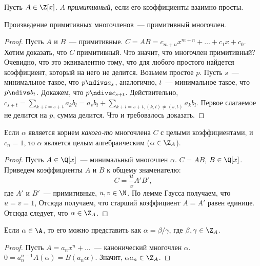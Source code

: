 \begin{df}
  Пусть $A \in \Z[x]$. $A$ \emph{примитивный}, если его коэффициенты
  взаимно просты.
\end{df}

\begin{lemma}[Гаусса]
  Произведение примитивных многочленов~— примитивный многочлен.
\end{lemma}
\begin{proof}
  Пусть $A$ и $B$~— примитивные. $C = AB = c_{m+n}x^{m+n} + \ldots +
  c_1 x + c_0$. Хотим доказать, что $C$ примитивный. Что значит, что
  многочлен примитивный? Очевидно, что это эквивалентно тому, что для
  любого простого найдется коэффициент, который на него не
  делится. Возьмем простое $p$. Пусть $s$~— минимальное такое, что $p
  \ndivs a_s$, аналогично, $t$~— минимальное такое, что $p \ndivs
  b_t$. Докажем, что $p \ndivs c_{s+t}$. Действительно, $c_{s+t} =
  \sum_{k+l = s+t} a_k b_l = a_s b_t + \sum_{k+l=s+t, (k, l) \ne
    (s,t)} a_k b_l$. Первое слагаемое не делится на $p$, сумма
  делится. Что и требовалось доказать.
\end{proof}

\begin{theorem}
  Если $\alpha$ является корнем \emph{какого-то} многочлена $C$ с
  целыми коэффициентами, и $c_n = 1$, то $\alpha$ является целым
  алгебраическим ($\alpha \in \Z_A$).
\end{theorem}
\begin{proof}
  Пусть $A \in \Q[x]$~— минимальный многочлен $\alpha$. $C = AB$, $B
  \in \Q[x]$. Приведем коэффициенты $A$ и $B$ к общему знаменателю:
  $$ C = \frac{u}{v} A' B',
  $$ где $A'$ и $B'$~— примитивные, $u, v \in \N$. По лемме Гаусса
  получаем, что $u = v = 1$, Отсюда получаем, что старший коэффициент
  $A = A'$ равен единице. Отсюда следует, что $\alpha \in \Z_A$.
\end{proof}

\begin{stm}
  Если $\alpha \in \A$, то его можно представить как $\alpha = \beta /
  \gamma$, где $\beta, \gamma \in \Z_A$.
\end{stm}
\begin{proof}
  Пусть $A = a_n x^n + \ldots$~— канонический многочлен $\alpha$. $0 =
  a_n^{n-1} A(\alpha) = B(a_n \alpha)$. Значит, $\alpha a_n \in \Z_A$.
\end{proof}

